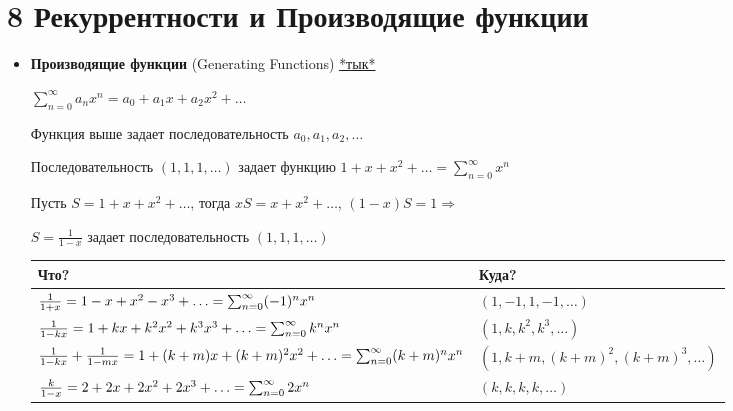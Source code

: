 \documentclass[12pt]{article}
\begin{document}
    \section{8 \quad Рекуррентности и Производящие функции}

    \begin{itemize}
        \item \textbf{Производящие функции} (Generating Functions)
        \hfill\href{https://ru.wikipedia.org/wiki/%D0%9F%D1%80%D0%BE%D0%B8%D0%B7%D0%B2%D0%BE%D0%B4%D1%8F%D1%89%D0%B0%D1%8F_%D1%84%D1%83%D0%BD%D0%BA%D1%86%D0%B8%D1%8F_%D0%BF%D0%BE%D1%81%D0%BB%D0%B5%D0%B4%D0%BE%D0%B2%D0%B0%D1%82%D0%B5%D0%BB%D1%8C%D0%BD%D0%BE%D1%81%D1%82%D0%B8}{*тык*}


        $\sum_{n = 0}^\infty a_n x^n = a_0 + a_1 x + a_2 x^2 + \dots$

        Функция выше задает последовательность $a_0, a_1, a_2, \dots$

        \Exs Последовательность $(1, 1, 1, \dots)$ задает функцию $1 + x + x^2 + \dots = \sum_{n = 0}^\infty x^n$

        Пусть $S = 1 + x + x^2 + \dots$, тогда $xS = x + x^2 + \dots$, $(1 - x) S = 1 \Longrightarrow $

        $S = \frac{1}{1 - x}$ задает последовательность $(1, 1, 1, \dots)$

        {
        \footnotesize
        \begin{tabular}{p{}|p{}}
            \hline

            \hfil Что? & \hfil Куда? \\

            \hline
            $\frac{1}{1 + x} = 1 - x + x^2 - x^3 + \dots \hfill = \sum_{n = 0}^\infty (-1)^n x^n$ & $(1, -1, 1, -1, \dots)$ \\

            $\frac{1}{1 - kx} = 1 + kx + k^2 x^2 + k^3 x^3 + \dots \hfill = \sum_{n = 0}^\infty k^n x^n$ & $(1, k, k^2, k^3, \dots)$ \\

            $\frac{1}{1 - kx} + \frac{1}{1 - mx} = 1 + (k + m)x + (k + m)^2 x^2 + \dots \hfill = \sum_{n = 0}^\infty (k + m)^n x^n$ & $(1, k + m, (k + m)^2, (k + m)^3, \dots)$ \\

            $\frac{k}{1 - x} = 2 + 2x + 2x^2 + 2x^3 + \dots \hfill = \sum_{n = 0}^\infty 2 x^n$ & $(k, k, k, k, \dots)$ \\


\end{tabular}}
\end{itemize}
\end{document}
